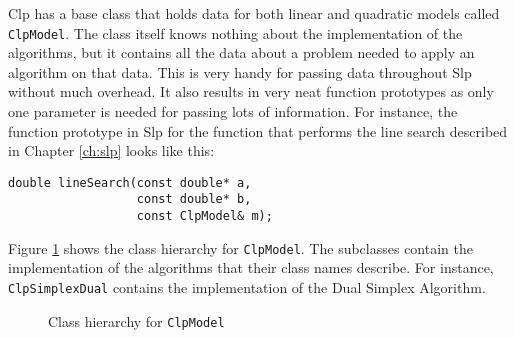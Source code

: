 Clp has a base class that holds data for both linear and quadratic models
called \texttt{ClpModel}.
The class itself knows nothing about the implementation of the algorithms, but
it contains all the data about a problem needed to apply an algorithm on that
data.
This is very handy for passing data throughout Slp without much overhead.
It also results in very neat function prototypes as only one parameter
is needed for passing lots of information. For instance, the function prototype
in Slp for the function that performs the line search described in Chapter
\ref{ch:slp} looks like this:
\begin{verbatim}
double lineSearch(const double* a,
                  const double* b,
                  const ClpModel& m);
\end{verbatim}
Figure \ref{fig:clpmodel} shows the class hierarchy for \texttt{ClpModel}.
The subclasses contain the implementation of the algorithms that their class
names describe. For instance, \texttt{ClpSimplexDual} contains the
implementation of the Dual Simplex Algorithm.
\begin{figure}
\centering
{}
\caption{Class hierarchy for \texttt{ClpModel}}
\label{fig:clpmodel}
\end{figure}
